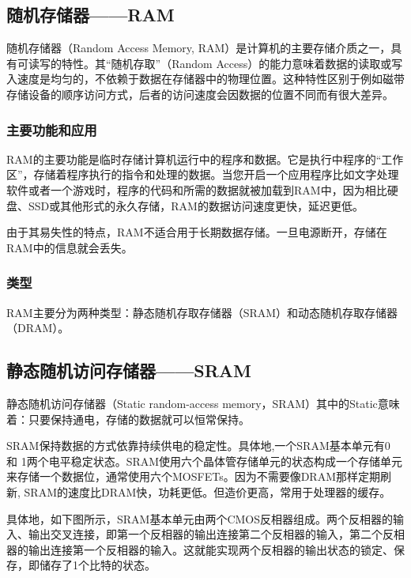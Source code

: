
\begin{issues}
\issueDraft
\end{issues}

\subsection{随机存储器——RAM}

随机存储器（Random Access Memory, RAM）是计算机的主要存储介质之一，具有可读写的特性。其“随机存取”（Random Access）的能力意味着数据的读取或写入速度是均匀的，不依赖于数据在存储器中的物理位置。这种特性区别于例如磁带存储设备的顺序访问方式，后者的访问速度会因数据的位置不同而有很大差异。
\subsubsection{主要功能和应用}
RAM的主要功能是临时存储计算机运行中的程序和数据。它是执行中程序的“工作区”，存储着程序执行的指令和处理的数据。当您开启一个应用程序比如文字处理软件或者一个游戏时，程序的代码和所需的数据就被加载到RAM中，因为相比硬盘、SSD或其他形式的永久存储，RAM的数据访问速度更快，延迟更低。

由于其易失性的特点，RAM不适合用于长期数据存储。一旦电源断开，存储在RAM中的信息就会丢失。
\subsubsection{类型}

RAM主要分为两种类型：静态随机存取存储器（SRAM）和动态随机存取存储器（DRAM）。


\subsection{静态随机访问存储器——SRAM}

静态随机访问存储器（Static random-access memory，SRAM）其中的Static意味着：只要保持通电，存储的数据就可以恒常保持。

SRAM保持数据的方式依靠持续供电的稳定性。具体地,一个SRAM基本单元有0 和 1两个电平稳定状态。SRAM使用六个晶体管存储单元的状态构成一个存储单元来存储一个数据位，通常使用六个MOSFETs。因为不需要像DRAM那样定期刷新, SRAM的速度比DRAM快，功耗更低。但造价更高，常用于处理器的缓存。

具体地，如下图所示，SRAM基本单元由两个CMOS反相器组成。两个反相器的输入、输出交叉连接，即第一个反相器的输出连接第二个反相器的输入，第二个反相器的输出连接第一个反相器的输入。这就能实现两个反相器的输出状态的锁定、保存，即储存了1个比特的状态。


